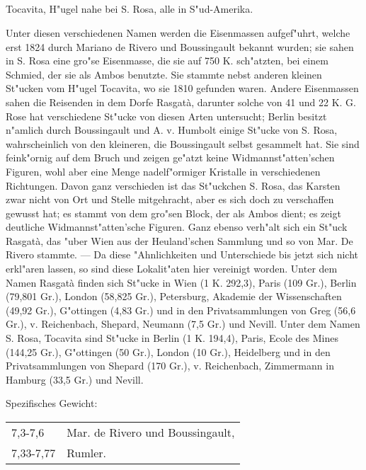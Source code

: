 \documentclass[a4paper, 11pt, oneside]{article}
\begin{document}
\subsection{}
\paragraph{}
Tocavita, H"ugel nahe bei S. Rosa, alle in S"ud-Amerika.

Unter diesen verschiedenen Namen werden die Eisenmassen aufgef"uhrt, welche erst 1824 durch Mariano de Rivero und Boussingault bekannt wurden; sie sahen in S. Rosa eine gro"se Eisenmasse, die sie auf 750 K. sch"atzten, bei einem Schmied, der sie als Ambos benutzte. Sie stammte nebst anderen kleinen St"ucken vom H"ugel Tocavita, wo sie 1810 gefunden waren. Andere Eisenmassen sahen die Reisenden in dem Dorfe Rasgatà, darunter solche von 41 und 22 K. G. Rose hat verschiedene St"ucke von diesen Arten untersucht; Berlin besitzt n"amlich durch Boussingault und A. v. Humbolt einige St"ucke von S. Rosa, wahrscheinlich von den kleineren, die Boussingault selbst gesammelt hat. Sie sind feink"ornig auf dem Bruch und zeigen ge"atzt keine Widmannst"atten'schen Figuren, wohl aber eine Menge nadelf"ormiger Kristalle in verschiedenen Richtungen. Davon ganz verschieden ist das St"uckchen S. Rosa, das Karsten zwar nicht von Ort und Stelle mitgehracht, aber es sich doch zu verschaffen gewusst hat; es stammt von dem gro"sen Block, der als Ambos dient; es zeigt deutliche Widmannst"atten'sche Figuren. Ganz ebenso verh"alt sich ein St"uck Rasgatà, das "uber Wien aus der Heuland'schen Sammlung und so von Mar. De Rivero stammte. --- Da diese "Ahnlichkeiten und Unterschiede bis jetzt sich nicht erkl"aren lassen, so sind diese Lokalit"aten hier vereinigt worden. Unter dem Namen Rasgatà finden sich St"ucke in Wien (1 K. 292,3), Paris (109 Gr.), Berlin (79,801 Gr.), London (58,825 Gr.), Petersburg, Akademie der Wissenschaften (49,92 Gr.), G"ottingen (4,83 Gr.) und in den Privatsammlungen von Greg (56,6 Gr.), v. Reichenbach, Shepard, Neumann (7,5 Gr.) und Nevill. Unter dem Namen S. Rosa, Tocavita sind St"ucke in Berlin (1 K. 194,4), Paris, Ecole des Mines (144,25 Gr.), G"ottingen (50 Gr.), London (10 Gr.), Heidelberg und in den Privatsammlungen von Shepard (170 Gr.), v. Reichenbach, Zimmermann in Hamburg (33,5 Gr.) und Nevill.

Spezifisches Gewicht:  
\begin{table}[!ht]
    \centering\swabfamily\Large
    \begin{tabular}{l l}
        7,3-7,6 & Mar. de Rivero und Boussingault,\\
        7,33-7,77 & Rumler.
    \end{tabular}
\end{table}
\end{document}
